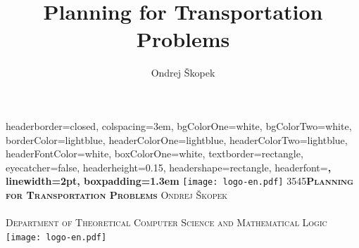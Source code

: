 \documentclass[a1paper,landscape,fontscale=0.45]{baposter} %
\title{\huge Planning for Transportation Problems} %
\author{Ondrej \v{S}kopek} %
\makeatletter
\newcommand\HUGE{\@setfontsize\Huge{35}{45}}
\newcommand{\insertdepartment}{Department of Theoretical Computer Science and Mathematical Logic}
\makeatother
\begin{document}
\begin{poster}
{
headerborder=closed, %
colspacing=3em, %
bgColorOne=white, %
bgColorTwo=white, %
borderColor=lightblue, %
headerColorOne=lightblue, %
headerColorTwo=lightblue, %
headerFontColor=white, %
boxColorOne=white, %
textborder=rectangle, %
eyecatcher=false, %
headerheight=0.15\textheight, %
headershape=rectangle, %
headerfont=\Large\bf\textsc, %
linewidth=2pt, %
boxpadding=1.3em
}
%
{\texttt{[image: logo-en.pdf]}} %
{\vspace{0.4em}\HUGE\bf\textsc{Planning for Transportation Problems}\vspace{0.3em}%
} %
{\Huge\textsc{Ondrej {\v{S}}kopek}\\\\\vspace{0.4em}%
\LARGE\textsc{\insertdepartment{}}} %
{\texttt{[image: logo-en.pdf]}} %


\end{poster}
\end{document}
